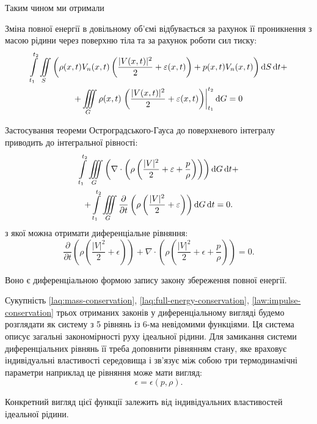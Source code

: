 Таким чином ми отримали
\begin{law}
	\label{laq:full-energy-conservation}
	Зміна повної енергії в довільному об'ємі відбувається за рахунок її проникнення з масою рідини через поверхню тіла та за рахунок роботи сил тиску:
	\begin{multline}
		\displaystyle\int\limits_{t_1}^{t_2} \displaystyle\iint\limits_S \left( \rho(x, t) V_n(x, t) \left( \frac{|V(x, t)|^2}{2} + \varepsilon(x, t) \right) + p(x, t) V_n(x, t) \right) \mathop{}\!\mathrm{d} S \mathop{}\!\mathrm{d} t + \\
		+ \displaystyle\iiint\limits_G \rho(x, t) \left. \left( \frac{|V(x, t)|^2}{2} + \varepsilon(x, t) \right) \right|_{t_1}^{t_2} \mathop{}\!\mathrm{d} G = 0
	\end{multline}
\end{law}

Застосування теореми Остроградського-Гауса до поверхневого інтегралу приводить до інтегральної рівності:
\begin{multline}
	\displaystyle\int\limits_{t_1}^{t_2} \displaystyle\iiint\limits_G \left(\nabla \cdot \left( \rho \left( \frac{|V|^2}{2} + \varepsilon + \frac{p}{\rho} \right) \right)\right) \mathop{}\!\mathrm{d} G \mathop{}\!\mathrm{d} t + \\
	+ \displaystyle\int\limits_{t_1}^{t_2} \displaystyle\iiint\limits_G \frac{\partial}{\partial t} \left( \rho \left( \frac{|V|^2}{2} + \varepsilon \right) \right) \mathop{}\!\mathrm{d} G \mathop{}\!\mathrm{d} t = 0.
\end{multline}
з якої можна отримати диференціальне рівняння:
\begin{equation}
	\frac{\partial}{\partial t} \left( \rho \left( \frac{|V|^2}{2} + \epsilon \right) \right) +\nabla \cdot \left( \rho \left( \frac{|V|^2}{2} + \epsilon + \frac{p}{\rho} \right) \right) = 0.
\end{equation}

Воно є диференціальною формою запису закону збереження повної енергії. \medskip

Сукупність \ref{laq:mass-conservation}, \ref{laq:full-energy-conservation}, \ref{law:impulse-conservation} трьох отриманих законів у диференціальному вигляді будемо розглядати як систему з 5 рівнянь із 6-ма невідомими функціями. Ця система описує загальні закономірності руху ідеальної рідини. Для замикання системи диференціальних рівнянь її треба доповнити рівнянням стану, яке враховує індивідуальні властивості середовища і зв'язує між собою три термодинамічні параметри наприклад це рівняння може мати вигляд:
\begin{equation}
	\epsilon = \epsilon(p, \rho).
\end{equation}

Конкретний вигляд цієї функції залежить від індивідуальних властивостей ідеальної рідини. 

